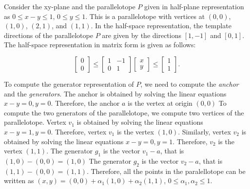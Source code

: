 \begin{example}
  \label{ex:ptope}
  Consider the xy-plane and the parallelotope $P$ given in half-plane representation as $0 \leq x-y \leq 1$, $0 \leq y \leq 1$.
  This is a parallelotope with vertices at $(0,0)$, $(1,0)$, $(2,1)$, and $(1,1)$.
  In the half-space representation, the template directions of the parallelotope $P$ are given by the directions $[1, -1]$ and $[0, 1]$.
  The half-space representation in matrix form is given as follows:

  \begin{equation}
    \begin{bmatrix} 0 \\ 0 \end{bmatrix} \leq \begin{bmatrix}  1 & -1 \\ 0 &  1 \end{bmatrix}  \begin{bmatrix} x \\ y \end{bmatrix} \leq \begin{bmatrix} 1 \\ 1 \end{bmatrix}. \label{eq:ptopeexample}
\end{equation}

  To compute the generator representation of $P$, we need to compute the \emph{anchor} and the \emph{generators}.
  The anchor is obtained by solving the linear equations $x-y = 0, y = 0$.
  Therefore, the anchor $a$ is the vertex at origin $(0,0)$
  To compute the two generators of the parallelotope, we compute two vertices of the parallelotope.
  Vertex $v_1$ is obtained by solving the linear equations $x - y = 1, y = 0$.
  Therefore, vertex $v_1$ is the vertex $(1,0)$.
  Similarly, vertex $v_2$ is obtained by solving the linear equations $x-y = 0, y = 1$.
  Therefore, $v_2$ is the vertex $(1,1)$.
  The generator $g_1$ is the vector $v_1 - a$, that is $(1,0)- (0,0) = (1,0)$
  The generator $g_2$ is the vector $v_2 - a$, that is $(1,1) - (0,0) = (1,1)$.
  Therefore, all the points in the paralellotope can be written as $(x,y) = (0,0) + \alpha_1 (1,0) + \alpha_2(1,1)$, $0 \leq \alpha_1, \alpha_2 \leq 1$.
\end{example}


